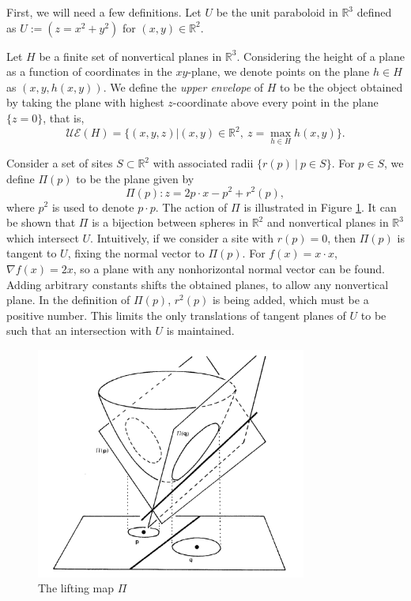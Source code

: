 \documentclass[a4paper, 11pt]{article}
\newcommand{\R}{\mathbb{R}}
\begin{document}
First, we will need a few definitions. Let $U$ be the unit paraboloid in $\R^3$ defined as $U := (z = x^2 + y^2)$ for $(x,y) \in \R^2$.

Let $H$ be a finite set of nonvertical planes in $\R^3$. Considering the height of a plane as a function of coordinates in the $xy$-plane, we denote points
on the plane $h \in H$ as $(x,y,h(x,y))$. We define the \textit{upper envelope} of $H$ to be the object obtained by taking the plane with highest
$z$-coordinate above every point in the plane $\{ z = 0 \}$, that is,
\[ \mathcal{UE}(H) = \{ (x,y,z) | (x,y) \in \R^2, \ z = \max_{h \in H} h(x,y) \} .\]

Consider a set of sites $S \subset \R^2$ with associated radii $\{r(p) \ | \ p \in S\}$. For $p \in S$, we define $\Pi(p)$ to be the plane given by
\[ \Pi(p) : z = 2 p \cdot x - p^2 + r^2(p) ,\]
where $p^2$ is used to denote $p \cdot p$. The action of $\Pi$ is illustrated in Figure \ref{fig:lift}. It can be shown that $\Pi$ is a bijection between spheres in $\R^2$ and nonvertical planes in $\R^3$ which
intersect $U$. Intuitively, if we consider a site with $r(p) = 0$, then $\Pi(p)$ is tangent to $U$, fixing the normal vector to $\Pi(p)$. For $f(x) =
x \cdot x$, $\nabla f(x) = 2x$, so a plane with any nonhorizontal normal vector can be found. Adding arbitrary constants shifts the obtained planes, to allow any
nonvertical plane. In the definition of $\Pi(p)$, $r^2(p)$ is being added, which must be a positive number. This limits the only translations of
tangent planes of $U$ to be such that an intersection with $U$ is maintained.

\begin{figure}[h]
  \centering
  \includegraphics[height=3in]{lifting(aur_surv).png}
  \caption{The lifting map $\Pi$}
  \label{fig:lift}
\end{figure}
\end{document}
